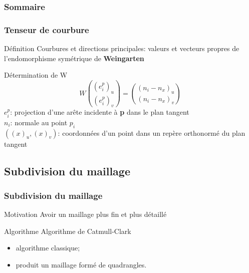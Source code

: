 \documentclass[9pt]{beamer}
\begin{document}
\begin{frame}
	\frametitle{Sommaire}
	\tableofcontents[currentsection]
\end{frame}


\begin{frame}
	\frametitle{Tenseur de courbure}
	
	\begin{block}{Définition}
		Courbures et directions principales: valeurs et vecteurs propres de l'endomorphisme symétrique de
		\textbf{Weingarten}
	\end{block}
	
	\begin{block}{Détermination de W}
		\begin{equation*}
			W{(e_i^p)_u \choose (e_i^p)_v} = {(n_i - n_x)_u \choose (n_i - n_x)_v}
		\end{equation*}
		$e_i^p$: projection d'une arête incidente à \textbf{p} dans le plan tangent \\
		$n_i$: normale au point $p_i$ \\
		$((x)_u, (x)_v)$: coordonnées d'un point dans un repère orthonormé du plan tangent
	\end{block}
\end{frame}


\subsection{Subdivision du maillage}
\begin{frame}
	\frametitle{Subdivision du maillage}
	
	\begin{block}{Motivation}
		Avoir un maillage plus fin et plus détaillé
	\end{block}
	
	\begin{block}{Algorithme}
		Algorithme de Catmull-Clark
		\begin{itemize}
			\item algorithme classique;
			\item produit un maillage formé de quadrangles.
		\end{itemize}
	\end{block}
\end{frame}
\end{document}
